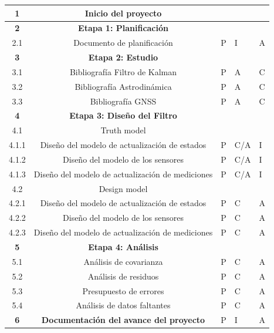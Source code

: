 \documentclass[11pt]{charter}
\begin{document}
\begin{table}[htpb]
{\begin{tabular}{|c|c|m{3cm}|m{3cm}|m{3cm}|}
\rowcolor{lightgray!50}
\textbf{1}	& \textbf{Inicio del proyecto}  						& 			 	& 			 	&  \\ \hline
\rowcolor{lightgray!50}
\textbf{2}	& \textbf{Etapa 1: Planificación} 						& 			 	& 				&			 \\ \hline
2.1 		& Documento de planificación 							& P 			& I				& A	\\ \hline
\rowcolor{lightgray!50}
\textbf{3}	& \textbf{Etapa 2: Estudio} 							& 			 	& 				&  \\ \hline
3.1			& Bibliografía Filtro de Kalman						& P 			& A 			& C	\\ \hline
3.2			& Bibliografía Astrodinámica							& P 			& A				& C	\\ \hline
3.3			& Bibliografía GNSS										& P 			& A				& C	\\ \hline
\rowcolor{lightgray!50}
\textbf{4}	& \textbf{Etapa 3: Diseño del Filtro}					& 				& 				& 	 \\ \hline
\rowcolor{lightgray!25}
4.1			& Truth model											& 	 			& 	 			&  \\ \hline
4.1.1		& Diseño del modelo de actualización de estados		& P	 			& C/A 			& I	\\ \hline
4.1.2		& Diseño del modelo de los sensores 					& P	 			& C/A 			& I	\\ \hline
4.1.3		& Diseño del modelo de actualización de mediciones	& P	 			& C/A			& I	\\ \hline
\rowcolor{lightgray!25}
4.2			& Design model											& 	 			& 	 			& 	\\ \hline
4.2.1		& Diseño del modelo de actualización de estados		& P	 			& C 			& A  \\ \hline
4.2.2		& Diseño del modelo de los sensores 					& P	 			& C 			& A	\\ \hline
4.2.3		& Diseño del modelo de actualización de mediciones	& P	 			& C	 			& A	\\ \hline
\rowcolor{lightgray!50}
\textbf{5}	& \textbf{Etapa 4: Análisis}							& 				& 				&  \\ \hline
5.1			& Análisis de covarianza								& P	 			& C	 			& A	\\ \hline
5.2			& Análisis de residuos 									& P	 			& C	 			& A	\\ \hline
5.3			& Presupuesto de errores								& P 			& C	 			& A	\\ \hline
5.4			& Análisis de datos faltantes							& P 			& C	 			& A	\\ \hline
\rowcolor{lightgray!50}
\textbf{6}	& \textbf{Documentación del avance del proyecto} 		& P				& I				& A \\ \hline

\end{tabular}}
\end{table}
\end{document}
